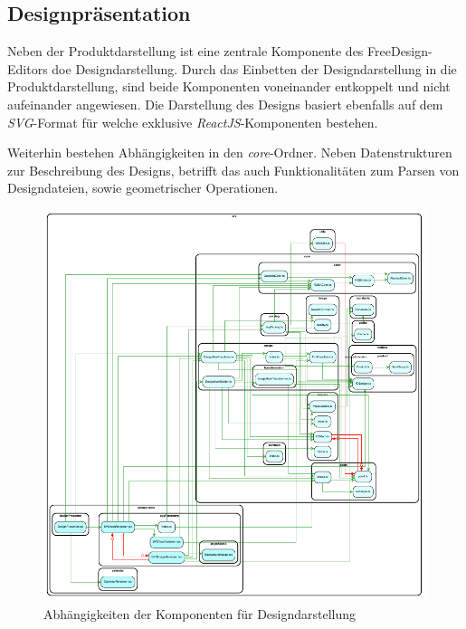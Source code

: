
\subsection{Designpräsentation}
Neben der Produktdarstellung ist eine zentrale Komponente des FreeDesign-Editors doe Designdarstellung.
Durch das Einbetten der Designdarstellung in die Produktdarstellung, sind beide Komponenten voneinander entkoppelt und nicht aufeinander angewiesen. Die Darstellung des Designs basiert ebenfalls auf dem \emph{SVG}-Format für welche exklusive \emph{ReactJS}-Komponenten bestehen.

Weiterhin bestehen Abhängigkeiten in den \emph{core}-Ordner. Neben Datenstrukturen zur Beschreibung des Designs, betrifft das auch Funktionalitäten zum Parsen von Designdateien, sowie geometrischer Operationen. 


\begin{figure}[H]
    \centering
    \includegraphics{diagrams/Ist-Architektur/design-presenter-analysis.pdf}
    \caption{Abhängigkeiten der Komponenten für Designdarstellung}
    \label{fig:Designdarstellung}
\end{figure}
\begin{multicols}{2}

\end{multicols}